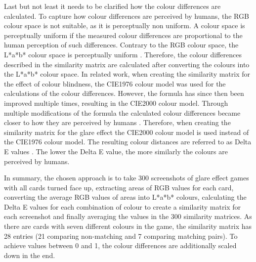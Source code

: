Last but not least it needs to be clarified how the colour differences are calculated. To capture how colour differences are perceived by humans, the RGB colour space is not suitable, as it is perceptually non uniform. A colour space is perceptually uniform if the measured colour differences are proportional to the human perception of such differences. Contrary to the RGB colour space, the L*a*b* colour space is perceptually uniform \cite[Chapter~1]{rgb_not}. Therefore, the colour differences described in the similarity matrix are calculated after converting the colours into the L*a*b* colour space. In related work, when creating the similarity matrix for the effect of colour blindness, the CIE1976 colour model was used for the calculations \cite[p.~5]{blind} of the colour differences. However, the formula has since then been improved multiple times, resulting in the CIE2000 colour model. Through multiple modifications of the formula the calculated colour differences became closer to how they are perceived by humans \cite[p.~12]{fischer}. Therefore, when creating the similarity matrix for the glare effect the CIE2000 colour model is used instead of the CIE1976 colour model. The resulting colour distances are referred to as Delta E values \cite[p.~15]{fischer}. The lower the Delta E value, the more similarly the colours are perceived by humans.

In summary, the chosen approach is to take 300 screenshots of glare effect games with all cards turned face up, extracting areas of RGB values for each card, converting the average RGB values of areas into L*a*b* colours, calculating the Delta E values for each combination of colour to create a similarity matrix for each screenshot and finally averaging the values in the 300 similarity matrices. As there are cards with seven different colours in the game, the similarity matrix has 28 entries (21 comparing non-matching and 7 comparing matching pairs). To achieve values between 0 and 1, the colour differences are additionally scaled down in the end.
 
